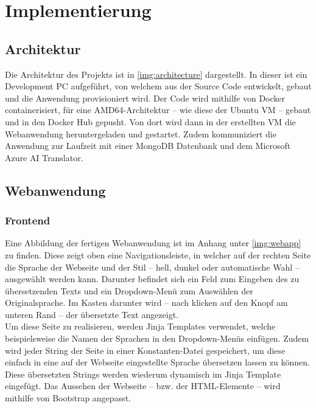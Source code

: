 


\chapter{Implementierung}\label{c:3}

\section{Architektur}\label{c:3_s:architecture}

Die Architektur des Projekts ist in \autoref{img:architecture} dargestellt. In dieser ist ein Development \ac{PC} aufgeführt, von welchem aus der Source Code entwickelt, gebaut und die Anwendung provisioniert wird. Der Code wird mithilfe von Docker containerisiert, für eine AMD64-Architektur -- wie diese der Ubuntu \ac{VM} -- gebaut und in den Docker Hub gepusht. Von dort wird dann in der erstellten \ac{VM} die Webanwendung heruntergeladen und gestartet. Zudem kommuniziert die Anwendung zur Laufzeit mit einer MongoDB Datenbank und dem Microsoft Azure \ac{AI} Translator.


\section{Webanwendung}\label{c:3_s:webapp}

\subsection{Frontend}\label{c:3_ss:frontend}
Eine Abbildung der fertigen Webanwendung ist im Anhang unter \ref{img:webapp} zu finden. Diese zeigt oben eine Navigationsleiste, in welcher auf der rechten Seite die Sprache der Webseite und der Stil -- hell, dunkel oder automatische Wahl -- ausgewählt werden kann. Darunter befindet sich ein Feld zum Eingeben des zu übersetzenden Texts und ein Dropdown-Menü zum Auswählen der Originalsprache. Im Kasten darunter wird -- nach klicken auf den Knopf am unteren Rand -- der übersetzte Text angezeigt.\\
Um diese Seite zu realisieren, werden Jinja Templates verwendet, welche beispielsweise die Namen der Sprachen in den Dropdown-Menüs einfügen. Zudem wird jeder String der Seite in einer Konstanten-Datei gespeichert, um diese einfach in eine auf der Webseite eingestellte Sprache übersetzen lassen zu können. Diese übersetzten Strings werden wiederum dynamisch im Jinja Template eingefügt. Das Aussehen der Webseite -- bzw. der \ac{HTML}-Elemente -- wird mithilfe von Bootstrap angepasst.


